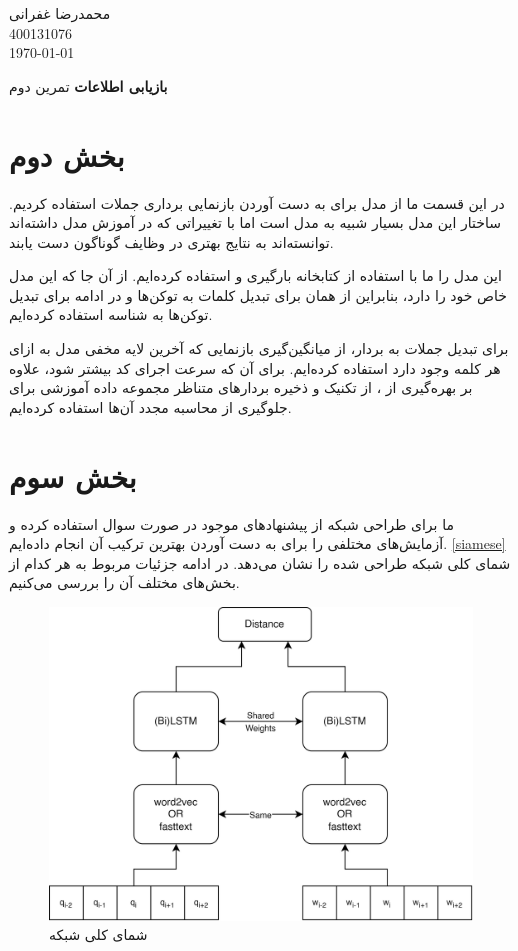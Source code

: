 \documentclass[12pt, a4paper]{book}
\newcommand{\coursetitle}{بازیابی اطلاعات}
\newcommand{\doctitle}{تمرین دوم}
\newcommand{\name}{محمدرضا غفرانی}
\newcommand{\studentno}{400131076}
\newcommand{\todaydate}{\today}
\begin{document}
\begin{flushleft}
    \name \\
    \studentno \\
    \todaydate
\end{flushleft}

\begin{center}
    \huge
    \textbf{\coursetitle}
    \break
    \large
    \doctitle
\end{center}

\thispagestyle{plain}

\section*{بخش دوم}

در این قسمت ما از مدل  برای به دست آوردن بازنمایی برداری جملات استفاده کردیم.
ساختار این مدل بسیار شبیه به مدل  است اما با تغییراتی که در آموزش مدل داشته‌اند توانسته‌اند
به نتایج بهتری در وظایف گوناگون دست یابند.

این مدل را ما با استفاده از کتابخانه  بارگیری و استفاده کرده‌ایم.
از آن جا که این مدل  خاص خود را دارد، بنابراین از همان برای تبدیل کلمات به
توکن‌ها و در ادامه برای تبدیل توکن‌ها به شناسه استفاده کرده‌ایم.

برای تبدیل جملات به بردار‌، از میانگین‌گیری بازنمایی که آخرین لایه مخفی مدل به ازای
هر کلمه وجود دارد استفاده کرده‌ایم. برای آن که سرعت اجرای کد بیشتر شود، علاوه بر بهره‌گیری از
، از تکنیک  و ذخیره بردار‌های متناظر مجموعه داده آموزشی برای جلوگیری از
محاسبه مجدد آن‌ها استفاده کرده‌ایم.

\section*{بخش سوم}

ما برای طراحی شبکه  از پیشنهاد‌های موجود در صورت سوال استفاده کرده‌ و آزمایش‌های مختلفی را برای
به دست آوردن بهترین ترکیب آن انجام داده‌ایم. \autoref{siamese} شمای کلی شبکه  طراحی شده را نشان می‌دهد.
در ادامه جزئیات مربوط به هر کدام از بخش‌های مختلف آن را بررسی می‌کنیم.

\begin{figure}[h]
    \centering
    \includegraphics[width=0.8\linewidth]{images/siamese.png}
    \caption{شمای کلی شبکه }
    \label{siamese}
\end{figure}
\end{document}
